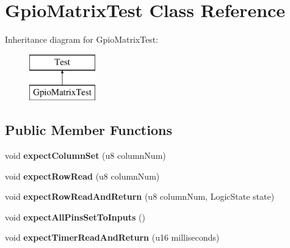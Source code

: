 \hypertarget{class_gpio_matrix_test}{}\section{Gpio\+Matrix\+Test Class Reference}
\label{class_gpio_matrix_test}
Inheritance diagram for Gpio\+Matrix\+Test\+:\begin{figure}[H]
\begin{center}
\leavevmode
\includegraphics[height=2.000000cm]{class_gpio_matrix_test}
\end{center}
\end{figure}
\subsection*{Public Member Functions}
\begin{DoxyCompactItemize}
\item 
\mbox{\label{class_gpio_matrix_test_a58437bf058e44d03d9db2b8ab705ccd4}} 
void {\bfseries expect\+Column\+Set} (u8 column\+Num)
\item 
\mbox{\label{class_gpio_matrix_test_a7124e2dd6dcce6bd53a317b3b10ad6ff}} 
void {\bfseries expect\+Row\+Read} (u8 column\+Num)
\item 
\mbox{\label{class_gpio_matrix_test_a66dda83c694378b9070d4a6405dca132}} 
void {\bfseries expect\+Row\+Read\+And\+Return} (u8 column\+Num, Logic\+State state)
\item 
\mbox{\label{class_gpio_matrix_test_aa6f850834ef815b28421b718bca34d3c}} 
void {\bfseries expect\+All\+Pins\+Set\+To\+Inputs} ()
\item 
\mbox{\label{class_gpio_matrix_test_a80fa3098bcc963eda7efa34baab054e7}} 
void {\bfseries expect\+Timer\+Read\+And\+Return} (u16 milliseconds)
\end{DoxyCompactItemize}
